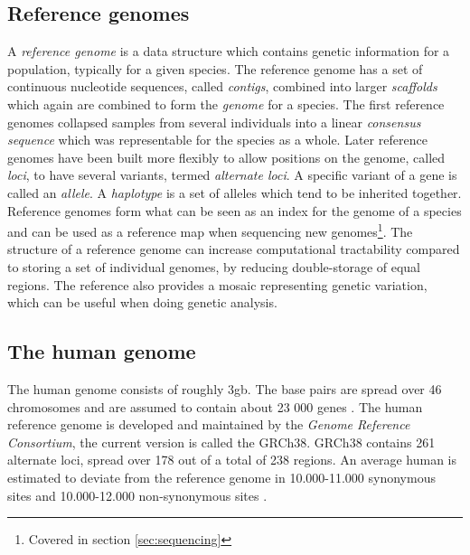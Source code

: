\documentclass[thesis.tex]{subfiles}
\begin{document}
\subsection{Reference genomes}
A \textit{reference genome} is a data structure which contains genetic information for a population, typically for a given species. The reference genome has a set of continuous nucleotide sequences, called \textit{contigs}, combined into larger \textit{scaffolds} which again are combined to form the \textit{genome} for a species. The first reference genomes collapsed samples from several individuals into a linear \textit{consensus sequence} which was representable for the species as a whole. Later reference genomes have been built more flexibly to allow positions on the genome, called \textit{loci}, to have several variants, termed \textit{alternate loci}. A specific variant of a gene is called an \textit{allele}. A \textit{haplotype} is a set of alleles which tend to be inherited together. Reference genomes form what can be seen as an index for the genome of a species and can be used as a reference map when sequencing new genomes\footnote{Covered in section \ref{sec:sequencing}}. The structure of a reference genome can increase computational tractability compared to storing a set of individual genomes, by reducing double-storage of equal regions. The reference also provides a mosaic representing genetic variation, which can be useful when doing genetic analysis.\\
\par\noindent
\subsection{The human genome}
\label{sec:human_genome}
The human genome consists of roughly 3gb. The base pairs are spread over 46 chromosomes and are assumed to contain about 23 000 genes \cite{introduction_to_genomics}. The human reference genome is developed and maintained by the \textit{Genome Reference Consortium}\cite{genome_reference_consortium}, the current version is called the GRCh38\cite{grch38}. GRCh38 contains 261 alternate loci, spread over 178 out of a total of 238 regions. An average human is estimated to deviate from the reference genome in 10.000-11.000 synonymous sites and 10.000-12.000 non-synonymous sites \cite{a_map_of_human_genome_variation_from_population_scale_sequencing}.
\end{document}
